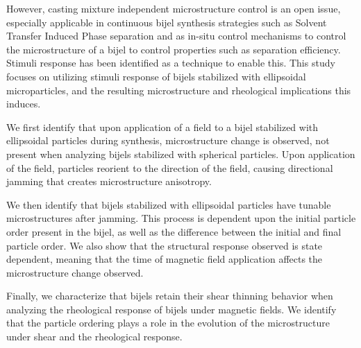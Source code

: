 \begin{front}
However, casting mixture independent microstructure control is an open issue, especially applicable in continuous 
bijel synthesis strategies such as Solvent Transfer Induced Phase separation and as in-situ control mechanisms to
control the microstructure of a bijel to control properties such as separation efficiency. Stimuli response has been identified as a 
technique to enable this. This study focuses on utilizing stimuli response of bijels stabilized with ellipsoidal microparticles, 
and the resulting microstructure and rheological implications this induces. 

We first identify that upon application of a field to a bijel stabilized with ellipsoidal particles during synthesis, 
microstructure change is observed, not present when analyzing bijels stabilized with spherical particles. Upon 
application of the field, particles reorient to the direction of the field, causing directional jamming that creates
microstructure anisotropy.

We then identify that bijels stabilized with ellipsoidal particles have tunable microstructures after jamming. 
This process is dependent upon the initial particle order present in the bijel, as well as the difference 
between the initial and final particle order. We also show that the structural response observed is state 
dependent, meaning that the time of magnetic field application affects the microstructure change observed.

Finally, we characterize that bijels retain their shear thinning behavior when analyzing the rheological response of bijels
under magnetic fields. We identify that the particle ordering plays a role in the evolution of the microstructure under shear
and the rheological response. 

\end{front}

